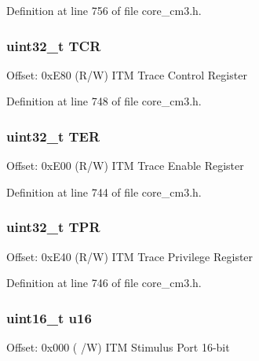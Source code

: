 Definition at line 756 of file core\+\_\+cm3.\+h.

\subsubsection[{\texorpdfstring{T\+CR}{TCR}}]{ uint32\+\_\+t T\+CR}\hypertarget{struct_i_t_m___type_a4111c001c1e56fd3f51d27c5a63b04e6}{}\label{struct_i_t_m___type_a4111c001c1e56fd3f51d27c5a63b04e6}
Offset\+: 0x\+E80 (R/W) I\+TM Trace Control Register 

Definition at line 748 of file core\+\_\+cm3.\+h.

\subsubsection[{\texorpdfstring{T\+ER}{TER}}]{ uint32\+\_\+t T\+ER}\hypertarget{struct_i_t_m___type_aa6530efad3a727fb3cc8f509403b9948}{}\label{struct_i_t_m___type_aa6530efad3a727fb3cc8f509403b9948}
Offset\+: 0x\+E00 (R/W) I\+TM Trace Enable Register 

Definition at line 744 of file core\+\_\+cm3.\+h.

\subsubsection[{\texorpdfstring{T\+PR}{TPR}}]{ uint32\+\_\+t T\+PR}\hypertarget{struct_i_t_m___type_afe5e266862734ca1082ceddff7180688}{}\label{struct_i_t_m___type_afe5e266862734ca1082ceddff7180688}
Offset\+: 0x\+E40 (R/W) I\+TM Trace Privilege Register 

Definition at line 746 of file core\+\_\+cm3.\+h.

\subsubsection[{\texorpdfstring{u16}{u16}}]{ uint16\+\_\+t u16}\hypertarget{struct_i_t_m___type_ae93660eefe2482a8564fae9a1ca39739}{}\label{struct_i_t_m___type_ae93660eefe2482a8564fae9a1ca39739}
Offset\+: 0x000 ( /W) I\+TM Stimulus Port 16-\/bit 

